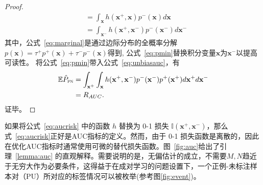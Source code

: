 \begin{lemma}
\begin{proof}
\begin{align}
			&= \int_\mathbf{x}h(\mathbf{x}^+,\mathbf{x})p^-(\mathbf{x})d\mathbf{x} \label{eq:variable} \\
			&= \int_\mathbf{x^-}h(\mathbf{x}^+,\mathbf{x}^-)p^-(\mathbf{x}^-)d\mathbf{x}^- \label{eq:pmin} 
		\end{align}
其中，公式~\eqref{eq:marginal}是通过边际分布的全概率分解$p(\mathbf{x})= \tau^+p^+(\mathbf{x}) + \tau^-p^-(\mathbf{x})$得到, 公式~\eqref{eq:pmin}替换积分变量$\mathbf{x}$为$\mathbf{x}^-$以提高可读性。 将公式~\eqref{eq:pmin}带入公式~\eqref{eq:unbiasauc}，有
		\begin{align}
			\mathbb{E}\hat{P}_\textsc{pn} &=\int_{\mathbf{x}^+} \int_\mathbf{x}h(\mathbf{x}^+,\mathbf{x}^-)p^-(\mathbf{x}^-) p^+(\mathbf{x}^+)d\mathbf{x}^+d\mathbf{x}^- \label{eq:aucrisk}\\
			&= R_{AUC}.
		\end{align}
证毕。
	\end{proof}	
\end{lemma}

如果将公式~\eqref{eq:aucrisk} 中的函数 $h$ 替换为 0-1 损失 $\mathbb{I}(\mathbf{x}^+,\mathbf{x}^-)$，那么式~\eqref{eq:aucrisk}正好是AUC指标的定义\cite{ml:2018}。然而，由于 0-1 损失函数是离散的，因此在优化AUC指标时通常使用可微的替代损失函数。图~\ref{fig:auc}给出了引理~\ref{lemma:auc} 的直观解释。需要说明的是，无偏估计的成立，不需要$M,N$趋近于无穷大作为必要条件，这得益于在成对学习的问题设置下，一个正例-未标注样本对（PU）所对应的标签情况可以被枚举(参考图\ref{fig:event})。

